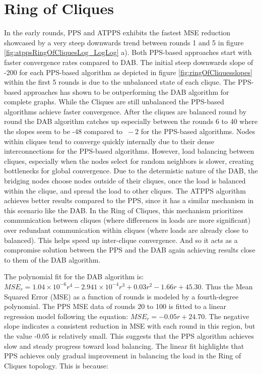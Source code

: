 \section{Ring of Cliques}\label{sec:ringofcliques}
In the early rounds, PPS and ATPPS exhibits the fastest MSE reduction showcased by a very steep downwards trend between rounds 1 and 5 in figure \ref{fig:atppsRingOfCliquesLog_LogLog} a). Both PPS-based approaches start with faster convergence rates compared to DAB. The initial steep downwards slope of -200 for each PPS-based algorithm as depicted in figure \ref{fig:ringOfCliquesslopes} within the first 5 rounds is due to the unbalanced state of each clique. The PPS-based approaches has shown to be outperforming the DAB algorithm for complete graphs. While the Cliques are still unbalanced the PPS-based algorithms achieve faster convergence. After the cliques are balanced round by round the DAB algorithm catches up especially between the rounds 6 to 40 where the slopes seem to be -48 compared to $~-2$ for the PPS-based algorithms.  Nodes within cliques tend to converge quickly internally due to their dense interconnections for the PPS-based algorithms. However, load balancing between cliques, especially when the nodes select for random neighbors is slower, creating bottlenecks for global convergence. Due to the determistic nature of the DAB, the bridging nodes choose nodes outside of their cliques, once the load is balanced within the clique, and spread the load to other cliques. The ATPPS algorithm achieves better results compared to the PPS, since it has a similar mechanism in this scenario like the DAB. In the Ring of Cliques, this mechanism prioritizes communication between cliques (where differences in loads are more significant) over redundant communication within cliques (where loads are already close to balanced). This helps speed up inter-clique convergence. And so it acts as a compromise solution between the PPS and the DAB again achieving results close to them of the DAB algorithm.

The polynomial fit for the DAB algorithm is: $MSE_r=1.04\times 10^{-6}r^{4}-2.941\times 10^{-4}r^{3}+0.03r^{2}-1.66r+45.30$. Thus the Mean Squared Error (MSE) as a function of rounds is modeled by a fourth-degree polynomial. The PPS MSE data of rounds 20 to 100 is fitted to a linear regression model following the equation: $MSE_r=-0.05r+24.70$. The negative slope indicates a consistent reduction in MSE with each round in this region, but the value -0.05 is relatively small. This suggests that the PPS algorithm achieves slow and steady progress toward load balancing. The linear fit highlights that PPS achieves only gradual improvement in balancing the load in the Ring of Cliques topology. This is because:

